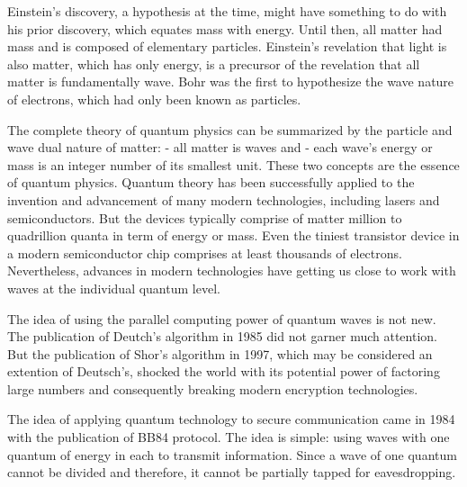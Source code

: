 \documentclass[oneside, letter, 12pt]{book}
\begin{document}
Einstein's discovery, a hypothesis at the time, might have something to do with his prior discovery, which equates mass with energy. Until then, all matter had mass and is composed of elementary particles. Einstein's revelation that light is also matter, which has only energy, is a precursor of the revelation that all matter is fundamentally wave. Bohr was the first to hypothesize the wave nature of electrons, which had only been known as particles.

The complete theory of quantum physics can be summarized by the particle and wave dual nature of matter:
- all matter is waves and
- each wave's energy or mass is an integer number of its smallest unit.
These two concepts are the essence of quantum physics. Quantum theory has been successfully applied to the invention and advancement of many modern technologies, including lasers and semiconductors. But the devices typically comprise of matter million to quadrillion quanta in term of energy or mass. Even the tiniest transistor device in a modern semiconductor chip comprises at least thousands of electrons. Nevertheless, advances in modern technologies have getting us close to work with waves at the individual quantum level.

The idea of using the parallel computing power of quantum waves is not new. The publication of Deutch's algorithm\cite{1985Deutsch} in 1985 did not garner much attention. But the publication of Shor's algorithm in 1997, which may be considered an extention of Deutsch's, shocked the world with its potential power of factoring large numbers and consequently breaking modern encryption technologies.

The idea of applying quantum technology to secure communication came in 1984 with the publication of BB84 protocol\cite{BB84}. The idea is simple: using waves with one quantum of energy in each to transmit information. Since a wave of one quantum cannot be divided and therefore, it cannot be partially tapped for eavesdropping.
\end{document}
